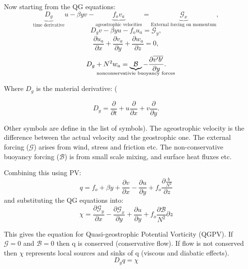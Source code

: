 Now starting from the \gls{QG} equations:
\begin{equation}
\underbrace{D_g}_\text{time derivative}u-\beta yv - \underbrace{f_o v_a}_\text{ageostrophic velocities} = \underbrace{\mathcal{G}_x}_\text{External forcing on momentum},
\label{eq:qg1}
\end{equation}
\begin{equation}
D_gv-\beta yu - f_o u_a = \mathcal{G}_y,
\label{eq:qg2}
\end{equation}
\begin{equation}
\frac{\partial u_a}{\partial x} + \frac{\partial v_a}{\partial y} + \frac{\partial w_a}{\partial z} = 0,
\label{eq:qg3}
\end{equation}
\begin{equation}
D_g +N^2 w_a = \underbrace{\mathcal{B}}_{\mathclap{\text{nonconservativie buoyancy forces}}} - \frac{\partial \overline{v'b'}}{\partial y}.
\label{eq:qg4}
\end{equation}

Where $D_g$ is the material derivative: (

\begin{equation}
D_g=\frac{\partial}{\partial t} + u\frac{\partial}{\partial x} + v \frac{\partial}{\partial y}.
\end{equation}

Other symbols are define in the list of symbols).
The ageostrophic velocity is the difference between the actual velocity and the geostrophic one. The external forcing ($\mathcal{G}$) arises from wind, stress and friction etc. The non-conservative buoyancy forcing ($\mathcal{B}$) is from small scale mixing, and surface heat fluxes etc. 

Combining this using \gls{PV}:
\begin{equation}
q = f_o + \beta y + \frac{\partial v}{\partial x} - \frac{\partial u}{\partial y} + f_o \frac{\partial \frac{b}{N^2}}{\partial z}
\label{eq:PV}
\end{equation}
and substituting the \gls{QG} equations into: 
\begin{equation}
\chi = \frac{\partial \mathcal{G}_y}{\partial x}-\frac{\partial \mathcal{G}_x}{\partial y} + \frac{\partial u}{\partial y} + f_o \frac{\partial \mathcal{B}}{N^2}{\partial z}
\end{equation}

This gives the equation for Quasi-geostrophic Potential Vorticity (QGPV).
If  $\mathcal{G}=0$ and $\mathcal{B}=0$ then q is conserved (conservative flow). If flow is not conserved then $\chi$ represents local sources and sinks of q (viscous and diabatic effects).
\begin{equation}
D_g q= \chi
\label{eq:QGPV}
\end{equation}



